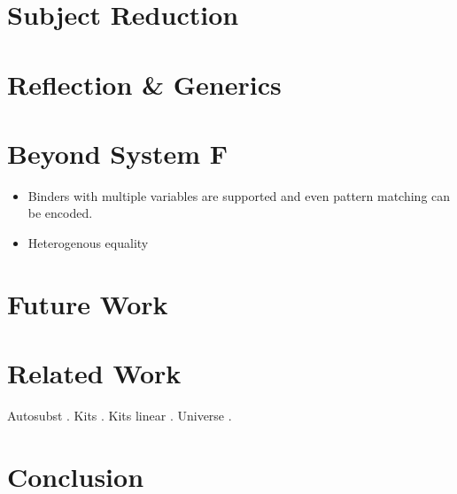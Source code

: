 \documentclass[sigplan,10pt]{acmart}
\newcommand*\AppCode[1]{{#1}}
\begin{document}
  \section{Subject Reduction}
  \AppCode\FSubjectReduction
  \AppCode\FSubjectReductionProofInteresting

  \section{Reflection \& Generics}

  \section{Beyond System F}
  \begin{itemize}
  \item Binders with multiple variables are supported and even pattern matching can be encoded.
  \item Heterogenous equality
  \end{itemize}

  \section{Future Work}

  \section{Related Work}
  Autosubst \cite{DBLP:conf/cpp/StarkSK19, DBLP:conf/itp/SchaferTS15}.
  Kits \cite{DBLP:journals/jar/BentonHKM12, unpublished:mcbride2005kits}.
  Kits linear \cite{DBLP:journals/corr/abs-2005-02247}.
  Universe \cite{DBLP:journals/pacmpl/AllaisA0MM18}.

  \section{Conclusion}

  

  \clearpage
  \appendix
\end{document}
